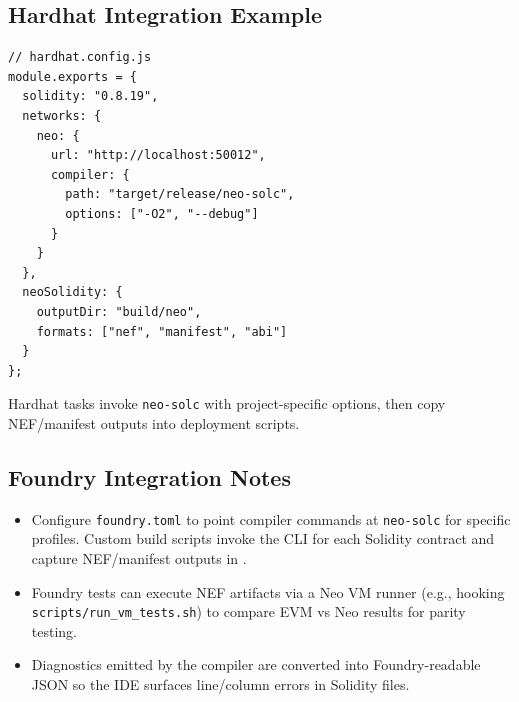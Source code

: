 \documentclass[11pt]{article}
\begin{document}
\subsection{Hardhat Integration Example}
\begin{small}
\begin{verbatim}
// hardhat.config.js
module.exports = {
  solidity: "0.8.19",
  networks: {
    neo: {
      url: "http://localhost:50012",
      compiler: {
        path: "target/release/neo-solc",
        options: ["-O2", "--debug"]
      }
    }
  },
  neoSolidity: {
    outputDir: "build/neo",
    formats: ["nef", "manifest", "abi"]
  }
};
\end{verbatim}
\end{small}
\noindent Hardhat tasks invoke \texttt{neo-solc} with project-specific options, then copy NEF/manifest outputs into deployment scripts.

\subsection{Foundry Integration Notes}
\begin{itemize}
    \item Configure \texttt{foundry.toml} to point compiler commands at \texttt{neo-solc} for specific profiles. Custom build scripts invoke the CLI for each Solidity contract and capture NEF/manifest outputs in .
    \item Foundry tests can execute NEF artifacts via a Neo VM runner (e.g., hooking \texttt{scripts/run_vm_tests.sh}) to compare EVM vs Neo results for parity testing.
    \item Diagnostics emitted by the compiler are converted into Foundry-readable JSON so the IDE surfaces line/column errors in Solidity files.
\end{itemize}
\end{document}
